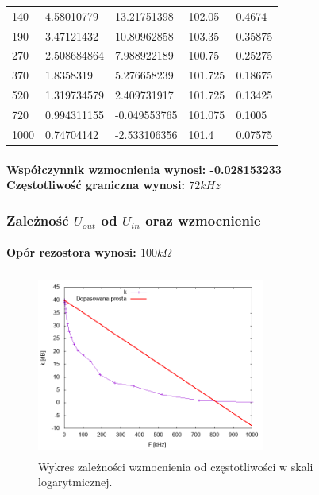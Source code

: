 \documentclass[a4paper,12pt]{article}
\begin{document}
\begin{justify}
\begin{center}
\begin{tabular}{ |p{3cm}|p{3cm}|p{3cm}|p{3cm}|p{3cm}| }
140 & 4.58010779 & 13.21751398 & 102.05 & 0.4674 \\
190 & 3.47121432 & 10.80962858 & 103.35 & 0.35875 \\
270 & 2.508684864 & 7.988922189 & 100.75 & 0.25275 \\
370 & 1.8358319 & 5.276658239 & 101.725 & 0.18675 \\
520 & 1.319734579 & 2.409731917 & 101.725 & 0.13425 \\
720 & 0.994311155 & -0.049553765 & 101.075 & 0.1005 \\
1000 & 0.74704142 & -2.533106356 & 101.4 & 0.07575 \\
\hline
\end{tabular}
\end{center}

\paragraph{Współczynnik wzmocnienia wynosi: -0.028153233 \\ Częstotliwość graniczna wynosi: $72kHz$}

\subsubsection{Zależność $U_{out}$ od $U_{in}$ oraz wzmocnienie}

\paragraph{Opór rezostora wynosi: $100\si{k\Omega}$}

\begin{figure}[h]
\centering
\includegraphics[width=7.5cm, height=6cm]{plot_nieodwracajacy_100kohm}
\caption{Wykres zależności wzmocnienia od częstotliwości w skali logarytmicznej.}
\end{figure}


\end{justify}
\end{document}
